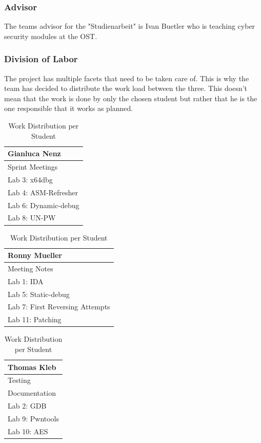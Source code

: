 \subsubsection*{Advisor}
The teams advisor for the "Studienarbeit" is Ivan Buetler who is teaching cyber security modules at the OST.

\subsubsection*{Division of Labor}
The project has multiple facets that need to be taken care of. This is why the team has decided to distribute the work load between the three. This doesn't mean that the work is done by only the chosen student but rather that he is the one responsible that it works as planned.
\begin{table}[H]
    \begin{tabular}[t]{||p{4cm}||}
        \hline
        Gianluca Nenz \\
        \hline\hline
        Sprint Meetings \\ 
        \hline
        Lab 3: x64dbg \\
        \hline
        Lab 4: ASM-Refresher \\ 
        \hline
        Lab 6: Dynamic-debug\\
        \hline
        Lab 8: UN-PW\\[1ex] 
        \hline
    \end{tabular}
    \hfill
    \begin{tabular}[t]{||p{4cm}||}
        \hline
        Ronny Mueller \\
        \hline\hline
        Meeting Notes \\
        \hline
        Lab 1: IDA \\ 
        \hline
        Lab 5: Static-debug \\
        \hline
        Lab 7: First Reversing Attempts \\ 
        \hline
        Lab 11: Patching\\[1ex] 
        \hline
    \end{tabular}
    \hfill
    \begin{tabular}[t]{||p{4cm}||}
        \hline
        Thomas Kleb \\
        \hline\hline
        Testing \\ 
        \hline
        Documentation \\
        \hline
        Lab 2: GDB \\ 
        \hline
        Lab 9: Pwntools\\
        \hline
        Lab 10: AES\\[1ex] 
        \hline
    \end{tabular}
    \caption{Work Distribution per Student}
    \label{work_dis}
\end{table}


